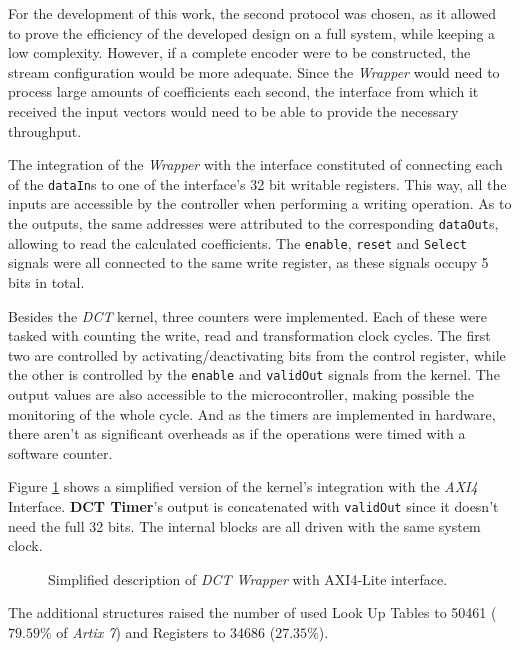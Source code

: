 For the development of this work, the second protocol was chosen, as it allowed to prove the efficiency of the developed design on a full system, while keeping a low complexity. However, if a complete encoder were to be constructed, the stream configuration would be more adequate. Since the \emph{Wrapper} would need to process large amounts of coefficients each second, the interface from which it received the input vectors would need to be able to provide the necessary throughput.

The integration of the \emph{Wrapper} with the interface constituted of connecting each of the \texttt{dataIn}s to one of the interface's 32 bit writable registers. This way, all the inputs are accessible by the controller when performing a writing operation. As to the outputs, the same addresses were attributed to the corresponding \texttt{dataOut}s, allowing to read the calculated coefficients. The \texttt{enable}, \texttt{reset} and \texttt{Select} signals were all connected to the same write register, as these signals occupy 5 bits in total.

Besides the \emph{DCT} kernel, three counters were implemented. Each of these were tasked with counting the write, read and transformation clock cycles. The first two are controlled by activating/deactivating bits from the control register, while the other is controlled by the \texttt{enable} and \texttt{validOut} signals from the kernel. The output values are also accessible to the microcontroller, making possible the monitoring of the whole cycle. And as the timers are implemented in hardware, there aren't as significant overheads as if the operations were timed with a software counter.

Figure \ref{fig:axi4int} shows a simplified version of the kernel's integration with the \emph{AXI4} Interface. \textbf{DCT Timer}'s output is concatenated with \texttt{validOut} since it doesn't need the full 32 bits. The internal blocks are all driven with the same system clock.

\begin{figure}[htb]
    \centering
    
    \caption{Simplified description of \emph{DCT Wrapper} with AXI4-Lite interface.}
    \label{fig:axi4int}
\end{figure}

The additional structures raised the number of used Look Up Tables to 50461 ($79.59\%$ of \emph{Artix 7}) and Registers to 34686 ($27.35\%$).

